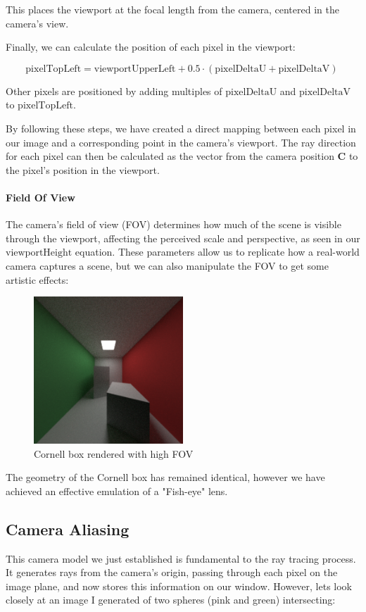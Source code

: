 \documentclass[12pt]{article}
\begin{document}
This places the viewport at the focal length from the camera, centered in the camera's view.

Finally, we can calculate the position of each pixel in the viewport:

$$ \text{pixelTopLeft} = \text{viewportUpperLeft} + 0.5 \cdot (\text{pixelDeltaU} + \text{pixelDeltaV})
    \ $$

Other pixels are positioned by adding multiples of $\text{pixelDeltaU}$ and $\text{pixelDeltaV}$ to $\text{pixelTopLeft}$.

By following these steps, we have created a direct mapping between each pixel in our image and a corresponding point in the camera's viewport. The ray direction for each pixel can then be calculated as the vector from the camera position $\mathbf{C}$ to the pixel's position in the viewport.


\paragraph{Field Of View} The camera's field of view (FOV) determines how much of the scene is visible through the viewport, affecting the perceived scale and perspective, as seen in our $\text{viewportHeight}$ equation.
These parameters allow us to replicate how a real-world camera captures a scene, but we can also manipulate the FOV to get some artistic effects:

\begin{figure}[H]
    \centering
    \includegraphics[width=0.5\textwidth]{images/artsy_rep/highFOV_cornell.png}
    \caption{Cornell box rendered with high FOV}
    \label{fig:highFOVBox}
\end{figure}

The geometry of the Cornell box has remained identical, however we have achieved an effective emulation of a "Fish-eye" lens.

\subsection{Camera Aliasing}
This camera model we just established is fundamental to the ray tracing process. It generates rays from the camera's origin, passing through each pixel on the image plane, and now stores this information on our window. However, lets look closely at an image I generated of two spheres (pink and green) intersecting:
\end{document}
